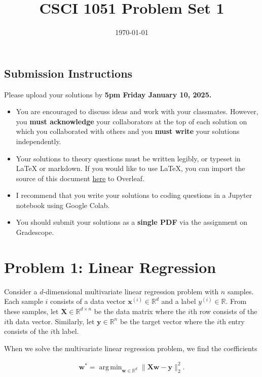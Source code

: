 \documentclass{article}
\title{CSCI 1051 Problem Set 1}
\author{} %
\date{\today}
\DeclareMathOperator*{\argmin}{arg\,min}
\begin{document}
\maketitle

\subsection*{Submission Instructions}

Please upload your solutions by
\textbf{5pm Friday January 10, 2025.}
\begin{itemize}
\item You are encouraged to discuss ideas
and work with your classmates. However, you
\textbf{must acknowledge} your collaborators
at the top of each solution on which
you collaborated with others 
and you \textbf{must write} your solutions
independently.
\item Your solutions to theory questions must
be written legibly, or typeset in LaTeX or markdown.
If you would like to use LaTeX, you can import the source of this document 
\href{https://www.rtealwitter.com/deeplearning/psets/pset1.tex}{here}
to Overleaf.
\item I recommend that you write your solutions to coding questions in a Jupyter notebook using Google Colab.
\item You should submit your solutions as a \textbf{single PDF} via the assignment on Gradescope.
\end{itemize}

\newpage \section*{Problem 1: Linear Regression}

Consider a $d$-dimensional multivariate linear regression problem with $n$ samples.
Each sample $i$ consists of a data vector $\mathbf{x}^{(i)} \in \mathbb{R}^d$ and a label $y^{(i)} \in \mathbb{R}$.
From these samples, let $\mathbf{X} \in \mathbb{R}^{d \times n}$ be the data matrix where the $i$th row consists of the $i$th data vector.
Similarly, let $\mathbf{y} \in \mathbb{R}^n$ be the target vector where the $i$th entry consists of the $i$th label.

When we solve the multivariate linear regression problem, we find the coefficients

\begin{align}
    \mathbf{w}^* = \argmin_{\mathbf{w} \in \mathbb{R}^d} \| \mathbf{Xw} - \mathbf{y} \|_2^2.
\end{align}
\end{document}
